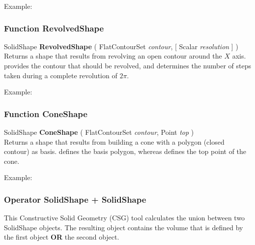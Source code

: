 Example: \\

\subsubsection{Function RevolvedShape \label{F:RevolvedShape}}
SolidShape \textbf{RevolvedShape} ( FlatContourSet \textit{contour},  [ Scalar \textit{resolution} ] ) \\
Returns a shape that results from revolving an open contour around the $X$ axis.  provides the contour that should be revolved, and  determines the number of steps taken during a complete revolution of $2 \pi$.


Example: \\

\subsubsection{Function ConeShape \label{F:ConeShape}}
SolidShape \textbf{ConeShape} ( FlatContourSet \textit{contour}, Point \textit{top} ) \\
Returns a shape that results from building a cone with a polygon (closed contour) as basis.  defines the basis polygon, whereas  defines the top point of the cone.

Example: \\

\subsubsection{Operator SolidShape + SolidShape \label{O:SolidShape+SolidShape}}
This Constructive Solid Geometry (CSG) tool calculates the union between two SolidShape objects. The resulting object contains the volume that is defined by the first object \textbf{OR} the second object.

